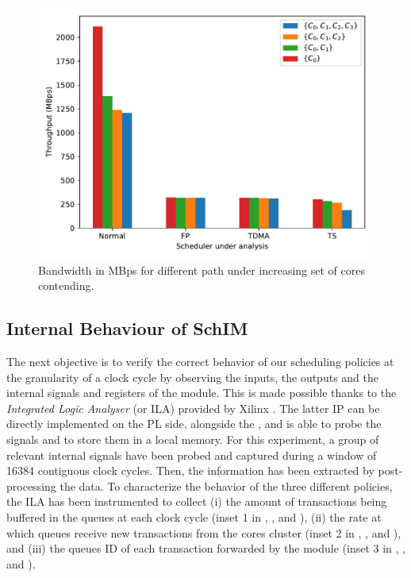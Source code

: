 \begin{figure}
  \centering
  \includegraphics[scale=0.5]{images/bw_comparisons.pdf}
  \caption{Bandwidth in MBps for different path under increasing set of cores contending.}
  \label{fig:bandwidth_comparison}
\end{figure}

\subsection{Internal Behaviour of SchIM}
\label{subsec:internal-behaviour-of-schim}
The next objective is to verify the correct behavior of our scheduling
policies at the granularity of a clock cycle by observing the inputs,
the outputs and the internal signals and registers of the \schim
module.  This is made possible thanks to the \emph{Integrated Logic
  Analyser} (or ILA) provided by Xilinx \cite{Xilinx-ILA}. The latter
IP can be directly implemented on the PL side, alongside the \schim,
and is able to probe the signals and to store them in a local
memory. For this experiment, a group of relevant internal signals have
been probed and captured during a window of 16384 contiguous clock
cycles. Then, the information has been extracted by post-processing
the data.  To characterize the behavior of the three different
policies, the ILA has been instrumented to collect (i) the amount of
transactions being buffered in the queues at each clock cycle (inset 1
in , , and
), (ii) the rate at which queues receive
new transactions from the cores cluster (inset 2 in
, , and
), and (iii) the queues ID of each
transaction forwarded by the \schim module (inset 3 in
, , and
).


